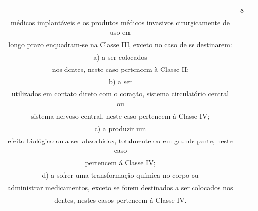 {{\begin{longtable}{|c|c|l|}
                                  & 8              & \begin{tabular}[c]{@{}l@{}}Todos os produtos\\ médicos implantáveis e os produtos médicos invasivos cirurgicamente de uso em\\ longo prazo enquadram-se na Classe III, exceto no caso de se destinarem:\\ a) a ser colocados\\ nos dentes, neste caso pertencem à Classe II;\\ b) a ser\\ utilizados em contato direto com o coração, sistema circulatório central ou\\ sistema nervoso central, neste caso pertencem á Classe IV;\\ c) a produzir um\\ efeito biológico ou a ser absorbidos, totalmente ou em grande parte, neste caso\\ pertencem á Classe IV;\\ d) a sofrer uma transformação química no corpo ou\\ administrar medicamentos, exceto se forem destinados a ser colocados nos\\ dentes, nestes casos pertencem á Classe IV.\end{tabular}                                                                                                                                                                                                                                                                                                                                                                             \\ \hline

\end{longtable}}}
